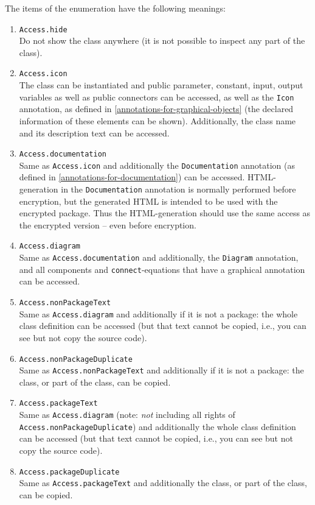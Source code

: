 The items of the  enumeration have the following meanings:
\begin{enumerate}
\item
  \lstinline!Access.hide!\\
  Do not show the class anywhere (it is not possible to inspect any part of the class).
\item
  \lstinline!Access.icon!\\
  The class can be instantiated and public parameter, constant, input, output variables as well as public connectors can be accessed, as well as the \lstinline!Icon! annotation, as defined in \cref{annotations-for-graphical-objects} (the declared information of these elements can be shown).
  Additionally, the class name and its description text can be accessed.
\item
  \lstinline!Access.documentation!\\
  Same as \lstinline!Access.icon! and additionally the \lstinline!Documentation! annotation (as defined in \cref{annotations-for-documentation}) can be accessed.
  HTML-generation in the \lstinline!Documentation! annotation is normally performed before encryption, but the generated HTML is intended to be used with the encrypted package.
  Thus the HTML-generation should use the same access as the encrypted version -- even before encryption.
\item
  \lstinline!Access.diagram!\\
  Same as \lstinline!Access.documentation! and additionally, the \lstinline!Diagram! annotation, and all components and \lstinline!connect!-equations that have a graphical annotation can be accessed.
\item
  \lstinline!Access.nonPackageText!\\
  Same as \lstinline!Access.diagram! and additionally if it is not a package: the whole class definition can be accessed (but that text cannot be copied, i.e., you can see but not copy the source code).
\item
  \lstinline!Access.nonPackageDuplicate!\\
  Same as \lstinline!Access.nonPackageText! and additionally if it is not a package: the class, or part of the class, can be copied.
\item
  \lstinline!Access.packageText!\\
  Same as \lstinline!Access.diagram! (note: \emph{not} including all rights of \lstinline!Access.nonPackageDuplicate!) and additionally the whole class definition can be accessed (but that text cannot be copied, i.e., you can see but not copy the source code).
\item
  \lstinline!Access.packageDuplicate!\\
  Same as \lstinline!Access.packageText! and additionally the class, or part of the class, can be copied.
\end{enumerate}

